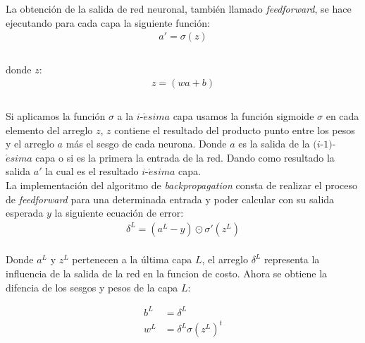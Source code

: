 \documentclass{iccmemoria}
\begin{document}
La obtención de la salida de red neuronal, también llamado \emph{feedforward}, se hace ejecutando para cada capa la siguiente función:\\

\begin{equation}
	\begin{split}
	a' = \sigma{(z)}\\
	\end{split}
\end{equation}\\

donde $z$:\\

\begin{equation}
	\begin{split}
	z = (wa + b)\\
	\end{split}
\end{equation}\\

Si aplicamos la función $\sigma$ a la $i$-$\acute{e}sima$ capa usamos la función sigmoide $\sigma$ en cada elemento del arreglo $z$, $z$ contiene el resultado del producto punto entre los pesos y el arreglo $a$ más el sesgo de cada neurona. Donde $a$ es la salida de la $(i$-$1)$-$\acute{e}sima$ capa o si es la primera la entrada de la red. Dando como resultado la salida $a'$ la cual es el resultado $i$-$\acute{e}sima$ capa.\\

La implementación del algoritmo de \emph{backpropagation} consta de realizar el proceso de \emph{feedforward} para una determinada entrada y poder calcular con su salida esperada $y$ la siguiente ecuación de error:\\

\begin{equation}
	\begin{split}
	\delta^L = (a^L-y) \odot \sigma'(z^L)
	\end{split}
\end{equation}\\

Donde $a^{L}$ y $z^{L}$ pertenecen a la última capa $L$, el arreglo $\delta^{L}$ representa la influencia de la salida de la red en la funcion de costo. Ahora se obtiene la difencia de los sesgos y pesos de la capa $L$:

\begin{equation}
	\begin{split}
	b^L & = \delta^L\\
	w^L & = \delta^L \sigma(z^L)^t
	\end{split}
\end{equation}\\
\end{document}
